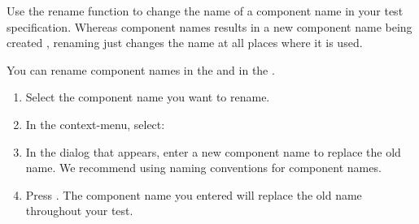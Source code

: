 
Use the rename function to change the name of a component name in your test specification. Whereas  component names results in a new component name being created , renaming just changes the name at all places where it is used. 

You can rename component names in the \gdcompnamebrowser{}  and in the \gdomeditor{}. 
\begin{enumerate}
\item Select the component name you want to rename. 
\item In the context-menu, select:\\
\item In the dialog that appears, enter a new component name to replace the old name. We recommend using naming conventions for component names. 
\item Press . The component name you entered will replace the old name throughout your test. 
\end{enumerate}

